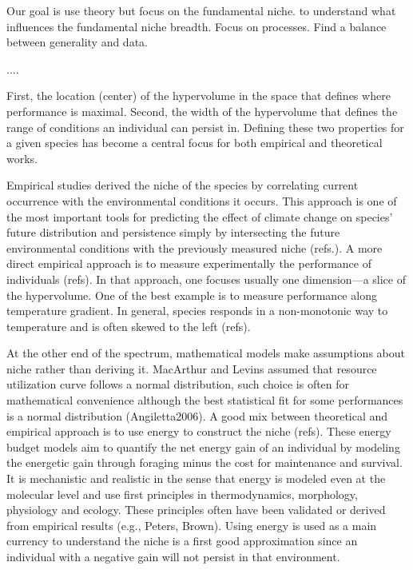 Our goal is use theory but focus on the fundamental niche.
to understand what influences the fundamental niche breadth.
Focus on processes.
Find a balance between generality and data. 

....   
  
  
First, the location (center) of the hypervolume in the space that defines where performance is maximal.
Second, the width of the hypervolume that defines the range of conditions an individual can persist in. 
Defining these two properties for a given species has become a central focus for both empirical and theoretical works.


Empirical studies derived the niche of the species by correlating current occurrence with the environmental conditions it occurs. 
This approach is one of the most important tools for predicting the effect of climate change on species' future distribution and persistence simply by intersecting the future environmental conditions with the previously measured niche (refs.).
A more direct empirical approach is to measure experimentally the performance of individuals (refs).
In that approach, one focuses usually one dimension---a slice of the hypervolume.
One of the best example is to measure performance along temperature gradient. 
In general, species responds in a non-monotonic way to temperature and is often skewed to the left (refs).

At the other end of the spectrum, mathematical models make assumptions about niche rather than deriving it. 
MacArthur and Levins assumed that resource utilization curve follows a normal distribution, such choice is often for mathematical convenience although the best statistical fit for some performances is a normal distribution (Angiletta2006). 
A good mix between theoretical and empirical approach is to use energy to construct the niche (refs).
These energy budget models aim to quantify the net energy gain of an individual by modeling the energetic gain through foraging minus the cost for maintenance and survival.
It is mechanistic and realistic in the sense that energy is modeled even at the molecular level and use first principles in thermodynamics, morphology, physiology and ecology.
These principles often have been validated or derived from empirical results (e.g., Peters, Brown).
Using energy is used as a main currency to understand the niche is a first good approximation since an individual with a negative gain will not persist in that environment.


